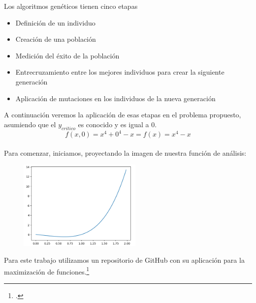 Los algoritmos genéticos tienen cinco etapas
\begin{itemize}
    \item Definición de un individuo
    \item Creación de una población
    \item Medición del éxito de la población 
    \item Entrecruzamiento entre los mejores individuos para crear la siguiente generación
    \item Aplicación de mutaciones en los individuos de la nueva generación
\end{itemize}
A continuación veremos la aplicación de esas etapas en el problema propuesto, asumiendo que el $y_{critico}$ es conocido y es igual a $0$.
\[f(x,0)=x^{4}+0^{4}-x=f(x)=x^{4}-x\]\\
\framebreak
Para comenzar, iniciamos, proyectando la imagen de nuestra función de análisis:
    \begin{figure}[h]
       \includegraphics[width=6cm]{Imagenes/p3 ecuacion.png}
        \centering
    \end{figure}
Para este trabajo utilizamos un repositorio de GitHub con su aplicación para la maximización de funciones.\footcite{Dan20}
\framebreak

